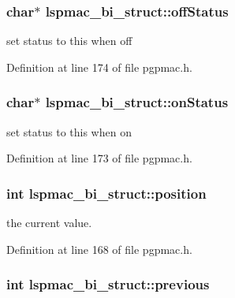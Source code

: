 \hypertarget{structlspmac__bi__struct_a34564b9372303ed2f1d0758ff5a3fcd8}{
\subsubsection[{off\-Status}]{\setlength{\rightskip}{0pt plus 5cm}char$\ast$ lspmac\-\_\-bi\-\_\-struct\-::off\-Status}}\label{structlspmac__bi__struct_a34564b9372303ed2f1d0758ff5a3fcd8}


set status to this when off 



Definition at line 174 of file pgpmac.\-h.

\hypertarget{structlspmac__bi__struct_a160aaae81ca309bcac3719a595a19f75}{
\subsubsection[{on\-Status}]{\setlength{\rightskip}{0pt plus 5cm}char$\ast$ lspmac\-\_\-bi\-\_\-struct\-::on\-Status}}\label{structlspmac__bi__struct_a160aaae81ca309bcac3719a595a19f75}


set status to this when on 



Definition at line 173 of file pgpmac.\-h.

\hypertarget{structlspmac__bi__struct_a76c4627028b86141c101f1764bebb7b0}{
\subsubsection[{position}]{\setlength{\rightskip}{0pt plus 5cm}int lspmac\-\_\-bi\-\_\-struct\-::position}}\label{structlspmac__bi__struct_a76c4627028b86141c101f1764bebb7b0}


the current value. 



Definition at line 168 of file pgpmac.\-h.

\hypertarget{structlspmac__bi__struct_a00f09cb3d7bdbe1058fb56bb8c2b0fa3}{
\subsubsection[{previous}]{\setlength{\rightskip}{0pt plus 5cm}int lspmac\-\_\-bi\-\_\-struct\-::previous}}\label{structlspmac__bi__struct_a00f09cb3d7bdbe1058fb56bb8c2b0fa3}


